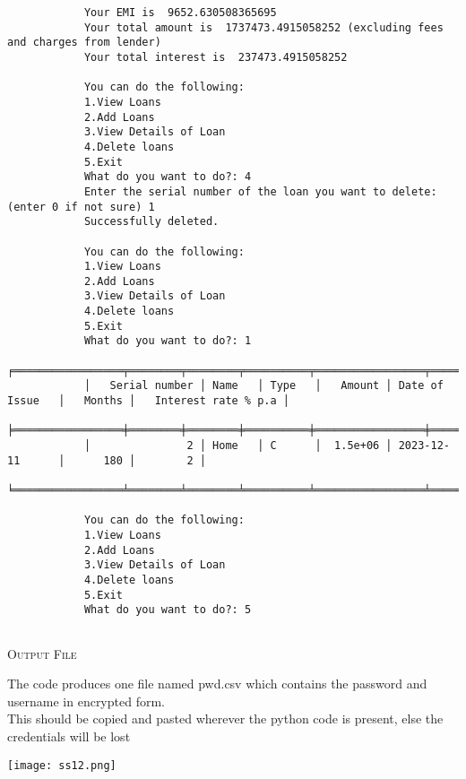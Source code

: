 \documentclass[12pt,a4paper]{article}
\begin{document}
\begin{normalsize}
\begin{verbatim}
			Your EMI is  9652.630508365695
			Your total amount is  1737473.4915058252 (excluding fees and charges from lender)
			Your total interest is  237473.4915058252 
			
			You can do the following:
			1.View Loans
			2.Add Loans
			3.View Details of Loan
			4.Delete loans
			5.Exit
			What do you want to do?: 4
			Enter the serial number of the loan you want to delete:(enter 0 if not sure) 1
			Successfully deleted.
			
			You can do the following:
			1.View Loans
			2.Add Loans
			3.View Details of Loan
			4.Delete loans
			5.Exit
			What do you want to do?: 1
			╒═════════════════╤════════╤════════╤══════════╤═════════════════╤══════════╤═══════════════════════╕
			│   Serial number │ Name   │ Type   │   Amount │ Date of Issue   │   Months │   Interest rate % p.a │
			╞═════════════════╪════════╪════════╪══════════╪═════════════════╪══════════╪═══════════════════════╡
			│               2 │ Home   │ C      │  1.5e+06 │ 2023-12-11      │      180 │        2 │
			╘═════════════════╧════════╧════════╧══════════╧═════════════════╧══════════╧═══════════════════════╛
			
			You can do the following:
			1.View Loans
			2.Add Loans
			3.View Details of Loan
			4.Delete loans
			5.Exit
			What do you want to do?: 5
			
		\end{verbatim}
	\end{normalsize}
	\newpage
	\begin{normalsize}
		{{\centering\scshape\huge Output File\par}}\vspace{0.5cm}
		The code produces one file named pwd.csv which contains the password and username in encrypted form.\\
		This should be copied and pasted wherever the python code is present, else the credentials will be lost\\
		\begin{center}
			\texttt{[image: ss12.png]}\par\vspace{1cm}
		\end{center}
	\end{normalsize}
	\newpage
\end{document}
